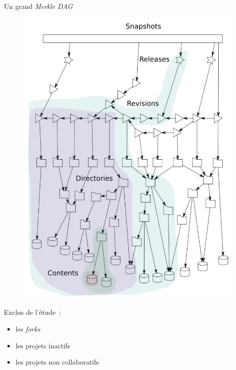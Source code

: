 \documentclass[usenames,dvipsnames,10pt]{beamer}
\newcommand{\mycite}[1]{%
    \citeauthor{#1} \citeyear{#1} \cite{#1}%
}
\begin{document}
\begin{frame}{Un grand \emph{Merkle DAG}}
    \begin{minipage}{.46\textwidth}
        \begin{figure}
            \includegraphics[width=\textwidth]{swh-graph}
        \end{figure}

        \mycite{swh-2019}
    \end{minipage}
    \begin{minipage}{.52\textwidth}
        Exclus de l'étude : \begin{itemize}
            \item les \emph{forks}
            \item les projets inactifs
            \item les projets non collaboratifs
        \end{itemize}

        \bigskip


\end{minipage}
\end{frame}
\end{document}
